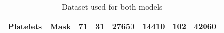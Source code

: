\begin{table}[H]
{\begin{tabular}{|cc|c|c|c|c|c|c|}
\multicolumn{1}{|c|}{\multirow{-2}{*}{{\color[HTML]{000000} \textbf{Platelets}}}}         & {\color[HTML]{000000} \textbf{Mask}}  & {\color[HTML]{000000} 71}                                                              & {\color[HTML]{000000} 31}                                                             & {\color[HTML]{000000} 27650}                                                          & {\color[HTML]{000000} 14410}                                                         & {\color[HTML]{000000} 102}                                                             & {\color[HTML]{000000} \textbf{42060}}                                                 \\ \hline
\end{tabular}%
}
\caption{Dataset used for both models}
\label{Dataset used for both models}
\end{table}
